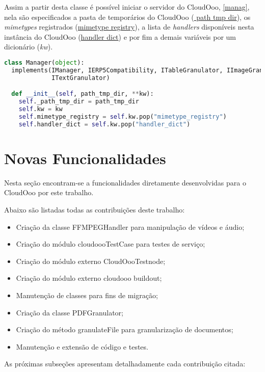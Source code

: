 Assim a partir desta classe é possível iniciar o servidor do CloudOoo, \ref{manag}, nela são especificados a pasta de temporários do CloudOoo (\underline{ path tmp dir}), os \textit{mimetypes} registrados (\underline{mimetype registry}), a lista de \textit{handlers} disponíveis nesta instância do CloudOoo (\underline{handler dict}) e por fim a demais variáveis por um dicionário (\textit{kw}).

{\singlespace
\begin{lstlisting}[caption=Inicialização do Manager,language=python,label={manag}]
class Manager(object):
  implements(IManager, IERP5Compatibility, ITableGranulator, IImageGranulator,
             ITextGranulator)

  def __init__(self, path_tmp_dir, **kw):
    self._path_tmp_dir = path_tmp_dir
    self.kw = kw
    self.mimetype_registry = self.kw.pop("mimetype_registry")
    self.handler_dict = self.kw.pop("handler_dict")
\end{lstlisting}
}

\section{Novas Funcionalidades}

Nesta seção encontram-se a funcionalidades diretamente desenvolvidas para o CloudOoo por este trabalho.

Abaixo são listadas todas as contribuições deste trabalho:

\begin{itemize}
    \item{Criação da classe FFMPEGHandler para manipulação de vídeos e áudio;}
    \item{Criação do módulo cloudoooTestCase para testes de serviço;}
    \item{Criação do módulo externo CloudOooTestnode;}
    \item{Criação do módulo externo cloudooo buildout;}
    \item{Manutenção de classes para fins de migração;}
    \item{Criação da classe PDFGranulator;}
    \item{Criação do método granulateFile para granularização de documentos;}
    \item{Manutenção e extensão de código e testes.}
\end{itemize}

As próximas subseções apresentam detalhadamente cada contribuição citada:

